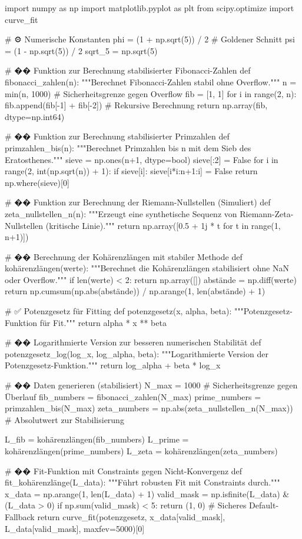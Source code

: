 import numpy as np
import matplotlib.pyplot as plt
from scipy.optimize import curve_fit

# ⚙️ Numerische Konstanten
phi = (1 + np.sqrt(5)) / 2  # Goldener Schnitt
psi = (1 - np.sqrt(5)) / 2
sqrt_5 = np.sqrt(5)

# �� Funktion zur Berechnung stabilisierter Fibonacci-Zahlen
def fibonacci_zahlen(n):
    """Berechnet Fibonacci-Zahlen stabil ohne Overflow."""
    n = min(n, 1000)  # Sicherheitsgrenze gegen Overflow
    fib = [1, 1]
    for i in range(2, n):
        fib.append(fib[-1] + fib[-2])  # Rekursive Berechnung
    return np.array(fib, dtype=np.int64)

# �� Funktion zur Berechnung stabilisierter Primzahlen
def primzahlen_bis(n):
    """Berechnet Primzahlen bis n mit dem Sieb des Eratosthenes."""
    sieve = np.ones(n+1, dtype=bool)
    sieve[:2] = False
    for i in range(2, int(np.sqrt(n)) + 1):
        if sieve[i]:
            sieve[i*i:n+1:i] = False
    return np.where(sieve)[0]

# �� Funktion zur Berechnung der Riemann-Nullstellen (Simuliert)
def zeta_nullstellen_n(n):
    """Erzeugt eine synthetische Sequenz von Riemann-Zeta-Nullstellen (kritische Linie)."""
    return np.array([0.5 + 1j * t for t in range(1, n+1)])

# �� Berechnung der Kohärenzlängen mit stabiler Methode
def kohärenzlängen(werte):
    """Berechnet die Kohärenzlängen stabilisiert ohne NaN oder Overflow."""
    if len(werte) < 2:
        return np.array([])
    abstände = np.diff(werte)
    return np.cumsum(np.abs(abstände)) / np.arange(1, len(abstände) + 1)

# ✅ Potenzgesetz für Fitting
def potenzgesetz(x, alpha, beta):
    """Potenzgesetz-Funktion für Fit."""
    return alpha * x ** beta

# �� Logarithmierte Version zur besseren numerischen Stabilität
def potenzgesetz_log(log_x, log_alpha, beta):
    """Logarithmierte Version der Potenzgesetz-Funktion."""
    return log_alpha + beta * log_x

# �� Daten generieren (stabilisiert)
N_max = 1000  # Sicherheitsgrenze gegen Überlauf
fib_numbers = fibonacci_zahlen(N_max)
prime_numbers = primzahlen_bis(N_max)
zeta_numbers = np.abs(zeta_nullstellen_n(N_max))  # Absolutwert zur Stabilisierung

L_fib = kohärenzlängen(fib_numbers)
L_prime = kohärenzlängen(prime_numbers)
L_zeta = kohärenzlängen(zeta_numbers)

# �� Fit-Funktion mit Constraints gegen Nicht-Konvergenz
def fit_kohärenzlänge(L_data):
    """Führt robusten Fit mit Constraints durch."""
    x_data = np.arange(1, len(L_data) + 1)
    valid_mask = np.isfinite(L_data) & (L_data > 0)
    if np.sum(valid_mask) < 5:
        return (1, 0)  # Sicheres Default-Fallback
    return curve_fit(potenzgesetz, x_data[valid_mask], L_data[valid_mask], maxfev=5000)[0]

